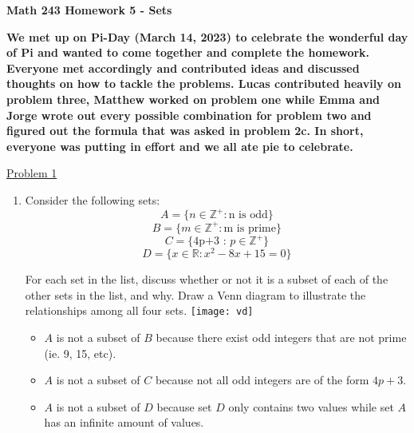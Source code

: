 \documentclass{article}
\newcommand{\R}{\mathbb{R}}
\newcommand{\Z}{\mathbb{Z}}
\begin{document}
\noindent\textbf{Math 243 \hfill Homework 5 - Sets}

\textbf{We met up on Pi-Day (March 14, 2023) to celebrate 
the wonderful day of Pi and wanted to come together and 
complete the homework. Everyone met accordingly and 
contributed ideas and discussed thoughts on how to tackle 
the problems. Lucas contributed heavily on problem three, 
Matthew worked on problem one while Emma and Jorge wrote 
out every possible combination for problem two and figured 
out the formula that was asked in problem 2c. In short, 
everyone was putting in effort and we all ate pie to 
celebrate.} 

\pagebreak 

\underline{Problem 1}

\begin{enumerate}
    \item Consider the following sets:
$$A = \{n \in \Z^+ : \text{n is odd}\}$$
$$B = \{m\in\Z^+:\text{m is prime}\}$$
$$C = \{\text{4p+3 : }p\in\Z^+\}$$
$$D = \{x\in\R: x^2-8x+15=0 \}$$

For each set in the list, discuss whether or not it is a subset of 
each of the other sets in the list, and why. Draw a Venn diagram to 
illustrate the relationships among all four sets.
\centering
\texttt{[image: vd]}

\begin{itemize}
    \item $A$ is not a subset of $B$ because there exist odd integers 
    that are not prime (ie. 9, 15, etc).
    \item $A$ is not a subset of $C$ because not all odd integers are 
    of the form $4p + 3$.
    \item $A$ is not a subset of $D$ because set $D$ only contains two values while set $A$ has an
    infinite amount of values.
    
\end{itemize}

\end{enumerate}
\end{document}
